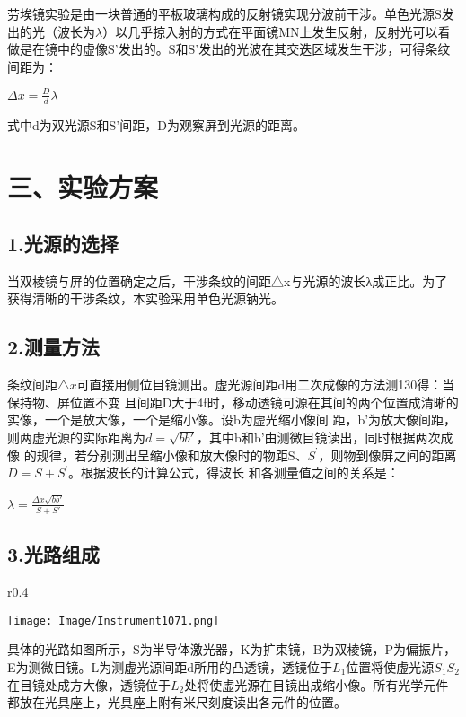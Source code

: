 \documentclass[11pt,a4paper,oneside]{article}
\begin{document}
劳埃镜实验是由一块普通的平板玻璃构成的反射镜实现分波前干涉。单色光源S发出的光（波长为$\lambda$）以几乎掠入射的方式在平面镜MN上发生反射，反射光可以看做是在镜中的虚像S’发出的。S和S’发出的光波在其交迭区域发生干涉，可得条纹间距为：

\begin{center}
$\Delta x=\displaystyle\frac{D}{d}\lambda$
\end{center}
   
式中d为双光源S和S’间距，D为观察屏到光源的距离。

\section*{三、实验方案}

\subsection*{1.光源的选择} 
 当双棱镜与屏的位置确定之后，干涉条纹的间距△x与光源的波长λ成正比。为了获得清晰的干涉条纹，本实验采用单色光源钠光。

\subsection*{2.测量方法}
 条纹间距${\bigtriangleup}{x}$可直接用侧位目镜测出。虚光源间距d用二次成像的方法测130得：当保持物、屏位置不变
 且间距D大于4f时，移动透镜可源在其间的两个位置成清晰的实像，一个是放大像，一个是缩小像。设b为虚光缩小像间
 距，b’为放大像间距，则两虚光源的实际距离为$d=\sqrt{b{b}'}$，其中b和b’由测微目镜读出，同时根据两次成像
 的规律，若分别测出呈缩小像和放大像时的物距S、$S^’$，则物到像屏之间的距离$D=S+S^’$。根据波长的计算公式，得波长
 和各测量值之间的关系是：
 \begin{center}
 $\lambda =\displaystyle\frac{\Delta x\sqrt{b{b}'}}{S+{S}'}$\\
 \end{center}
 
\subsection*{3.光路组成}
\begin{wrapfigure}{r}{0.4\textwidth}
  \vspace{-20pt}
  \begin{center}
    \texttt{[image: Image/Instrument1071.png]}
  \end{center}
  \vspace{-20pt}
  \vspace{-10pt}
\end{wrapfigure}
 具体的光路如图所示，S为半导体激光器，K为扩束镜，B为双棱镜，P为偏振片，E为测微目镜。L为测虚光源间距d所用的凸透镜，透镜位于${L_1}$位置将使虚光源${S_1}{S_2}$在目镜处成方大像，透镜位于${L_2}$处将使虚光源在目镜出成缩小像。所有光学元件都放在光具座上，光具座上附有米尺刻度读出各元件的位置。
 
\end{document}
